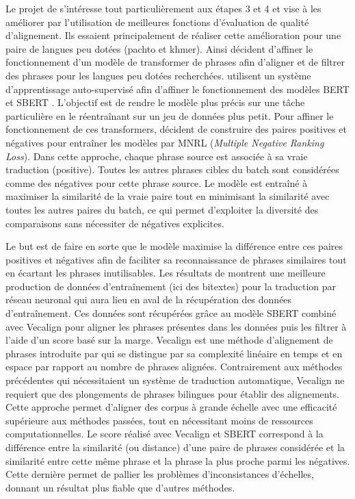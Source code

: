 Le projet de \citet{tan_2022} s'intéresse tout particulièrement aux étapes 3 et 4 et vise à les
améliorer par l'utilisation de meilleures fonctions d'évaluation de qualité d'alignement. Ils essaient
principalement de réaliser
cette amélioration pour une paire de langues peu dotées (pachto et khmer). Ainsi \citet{tan_2022}
décident d'affiner le fonctionnement d'un modèle de transformer de phrases
afin d'aligner et de filtrer
des phrases pour les langues peu dotées recherchées.
\citet{tan_2022} utilisent un système d'apprentissage
auto-supervisé \citep{chen_2020, henderson_2017} afin d'affiner le fonctionnement des modèles BERT
\citep{devlin_2019} et \allowbreak SBERT \citep{reimers_2019}.
L'objectif est de rendre le modèle plus précis sur une tâche particulière en le réentraînant sur un jeu de données
plus petit. Pour affiner le fonctionnement de ces transformers,
\citet{tan_2022} décident de construire des paires positives et négatives pour entraîner les modèles par
\gls{MNRL} (\textit{Multiple Negative Ranking Loss}).
Dans cette approche, chaque phrase source est associée à sa vraie traduction (positive). Toutes les autres phrases
cibles du batch sont considérées comme des négatives pour cette phrase source. Le modèle est entraîné à maximiser
la similarité de la vraie paire tout en minimisant la similarité avec toutes les autres paires du batch, ce qui
permet d'exploiter la diversité des comparaisons sans nécessiter de négatives explicites.

Le but est de faire en sorte que le modèle maximise la différence entre ces paires positives et négatives afin
de faciliter sa reconnaissance de phrases similaires tout en écartant les phrases inutilisables.
Les résultats de \citet{tan_2022} montrent une meilleure production de données d'entraînement (ici des bitextes)
pour la traduction par réseau neuronal qui aura lieu en aval de la récupération des données d'entraînement.
Ces données sont récupérées grâce au modèle SBERT \citep{reimers_2019}
combiné avec Vecalign \citep{thompson_2019} pour aligner les phrases présentes dans les données puis les filtrer à l'aide d'un score basé sur la marge.
Vecalign est une méthode d'alignement de phrases introduite par \citet{thompson_2019} qui se distingue par sa complexité
linéaire en temps et en espace par rapport au nombre de phrases alignées. Contrairement aux méthodes précédentes qui nécessitaient un système
de traduction automatique, Vecalign ne requiert que des plongements de phrases bilingues pour établir des alignements. Cette approche
permet d'aligner des corpus à grande échelle avec une efficacité supérieure aux méthodes passées, tout en nécessitant moins de
ressources computationnelles.
Le score réalisé avec Vecalign et SBERT correspond à la différence entre la similarité (ou distance) d’une paire de phrases considérée et la similarité
entre cette même phrase et la phrase la plus proche parmi les négatives. Cette dernière permet de pallier les problèmes
d'inconsistances d'échelles, donnant un résultat plus fiable que d'autres méthodes.

